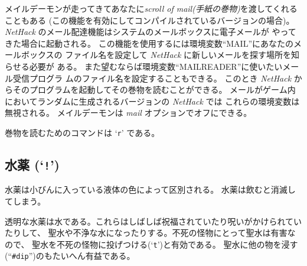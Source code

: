 メイルデーモンが走ってきてあなたに{\it scroll of mail(手紙の巻物)}を渡してくれることもある
(この機能を有効にしてコンパイルされているバージョンの場合)。
{\it NetHack\/} のメール配達機能はシステムのメールボックスに電子メールが
やってきた場合に起動される。
この機能を使用するには環境変数``MAIL''にあなたのメールボックスの
ファイル名を設定して {\it NetHack\/} に新しいメールを探す場所を知らせる必要が
ある。
また望むならば環境変数``MAILREADER''に使いたいメール受信プログラ
ムのファイル名を設定することもできる。
このとき {\it NetHack\/} からそのプログラムを起動してその巻物を読むことができる。
メールがゲーム内においてランダムに生成されるバージョンの {\it NetHack\/} では
これらの環境変数は無視される。
メイルデーモンは
{\it mail\/}
オプションでオフにできる。

巻物を読むためのコマンドは `{\tt r}' である。

\subsection*{水薬 (`{\tt !}')}

水薬は小びんに入っている液体の色によって区別される。
水薬は飲むと消滅してしまう。

透明な水薬は水である。これらはしばしば祝福されていたり呪いがかけられていたりして、
聖水や不浄な水になったりする。不死の怪物にとって聖水は有害なので、
聖水を不死の怪物に投げつける(`{\tt t}')と有効である。
聖水に他の物を浸す(``{\tt \#dip}'')のもたいへん有益である。


